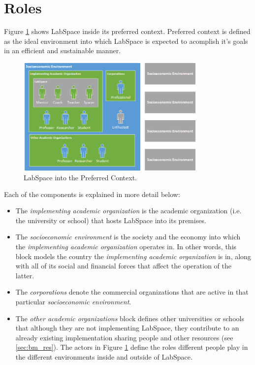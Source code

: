 \documentclass[a4paper, 11pt]{article}
\begin{document}
\section{Roles} \label{sec:roles}
Figure \ref{fig:ls_env} shows LabSpace inside its preferred context. Preferred context is defined as the ideal environment into which LabSpace is expected to acomplish it's goals in an efficient and sustainable manner.

\begin{figure}[h!]
  \begin{center}
    \includegraphics[width=350px,height=\textheight,keepaspectratio]{imagery/ls_context.png}
    \caption{LabSpace into the Preferred Context.}
    \label{fig:ls_env}
  \end{center}
\end{figure}

Each of the components is explained in more detail below:

\begin{itemize}[noitemsep]
    \item The \textit{implementing academic organization} is the academic organization (i.e. the university or school) that hosts LabSpace into its premises.
    \item The \textit{socioeconomic environment} is the society and the economy into which the \textit{implementing academic organization} operates in. In other words, this block models the country the \textit{implementing academic organization} is in, along with all of its social and financial forces that affect the operation of the latter.
    \item The \textit{corporations} denote the commercial organizations that are active in that particular \textit{socioeconomic environment}.
    \item The \textit{other academic organizations} block defines other universities or schools that although they are not implementing LabSpace, they contribute to an already existing implementation sharing people and other resources (see \ref{sec:bm_res}). The actors in Figure \ref{fig:ls_env} define the roles different people play in the different environments inside and outside of LabSpace. 
\end{itemize}
\end{document}
